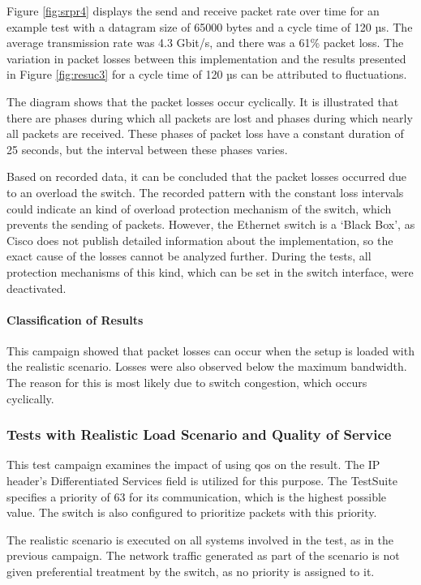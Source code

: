 Figure \ref{fig:srpr4} displays the send and receive packet rate over time for an example test with a datagram size of 65000 bytes and a cycle time of 120 µs. The average transmission rate was 4.3 Gbit/s, and there was a 61\% packet loss. The variation in packet losses between this implementation and the results presented in Figure \ref{fig:resuc3} for a cycle time of 120 µs can be attributed to fluctuations.

The diagram shows that the packet losses occur cyclically. It is illustrated that there are phases during which all packets are lost and phases during which nearly all packets are received. These phases of packet loss have a constant duration of 25 seconds, but the interval between these phases varies.

Based on recorded data, it can be concluded that the packet losses occurred due to an overload the switch. The recorded pattern with the constant loss intervals could indicate an kind of overload protection mechanism of the switch, which prevents the sending of packets. However, the Ethernet switch is a `Black Box', as Cisco does not publish detailed information about the implementation, so the exact cause of the losses cannot be analyzed further. During the tests, all protection mechanisms of this kind, which can be set in the switch interface, were deactivated.

\paragraph{Classification of Results}
This campaign showed that packet losses can occur when the setup is loaded with the realistic scenario. Losses were also observed below the maximum bandwidth. The reason for this is most likely due to switch congestion, which occurs cyclically.

\subsubsection{Tests with Realistic Load Scenario and Quality of Service}
This test campaign examines the impact of using \ac{qos} on the result. The IP header's Differentiated Services field is utilized for this purpose. The TestSuite specifies a priority of 63 for its communication, which is the highest possible value. The switch is also configured to prioritize packets with this priority.

The realistic scenario is executed on all systems involved in the test, as in the previous campaign. The network traffic generated as part of the scenario is not given preferential treatment by the switch, as no priority is assigned to it.

